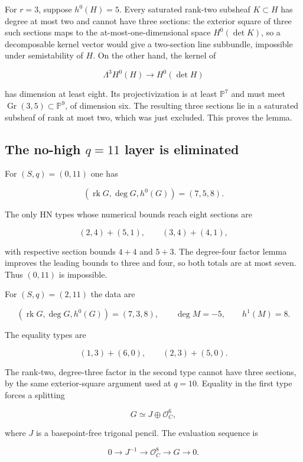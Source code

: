 \documentclass[11pt]{article}
\theoremstyle{definition}
\begin{document}
For \(r=3\), suppose \(h^0(H)=5\). Every saturated rank-two subsheaf
\(K\subset H\) has degree at most two and cannot have three sections:
the exterior square of three such sections maps to the
at-most-one-dimensional space \(H^0(\det K)\), so a decomposable kernel
vector would give a two-section line subbundle, impossible under
semistability of \(H\). On the other hand, the kernel of

\[\Lambda^3H^0(H)\longrightarrow H^0(\det H)\]

has dimension at least eight. Its projectivization is at least
\(\mathbb P^7\) and must meet
\(\operatorname{Gr}(3,5)\subset\mathbb P^9\), of dimension six. The
resulting three sections lie in a saturated subsheaf of rank at most
two, which was just excluded. This proves the lemma.

\subsection{\texorpdfstring{The no-high \(q=11\) layer is
eliminated}{The no-high q=11 layer is eliminated}}\label{the-no-high-q11-layer-is-eliminated}

For \((S,q)=(0,11)\) one has

\[(\operatorname{rk}G,\deg G,h^0(G))=(7,5,8).\]

The only HN types whose numerical bounds reach eight sections are

\[(2,4)+(5,1),\qquad (3,4)+(4,1),\]

with respective section bounds \(4+4\) and \(5+3\). The degree-four
factor lemma improves the leading bounds to three and four, so both
totals are at most seven. Thus \((0,11)\) is impossible.

For \((S,q)=(2,11)\) the data are

\[(\operatorname{rk}G,\deg G,h^0(G))=(7,3,8),
\qquad \deg M=-5,\qquad h^1(M)=8.\]

The equality types are

\[(1,3)+(6,0),\qquad (2,3)+(5,0).\]

The rank-two, degree-three factor in the second type cannot have three
sections, by the same exterior-square argument used at \(q=10\).
Equality in the first type forces a splitting

\[G\simeq J\oplus\mathcal O_C^6,\]

where \(J\) is a basepoint-free trigonal pencil. The evaluation sequence
is

\[0\longrightarrow J^{-1}\longrightarrow\mathcal O_C^8
\longrightarrow G\longrightarrow0.\]
\end{document}
